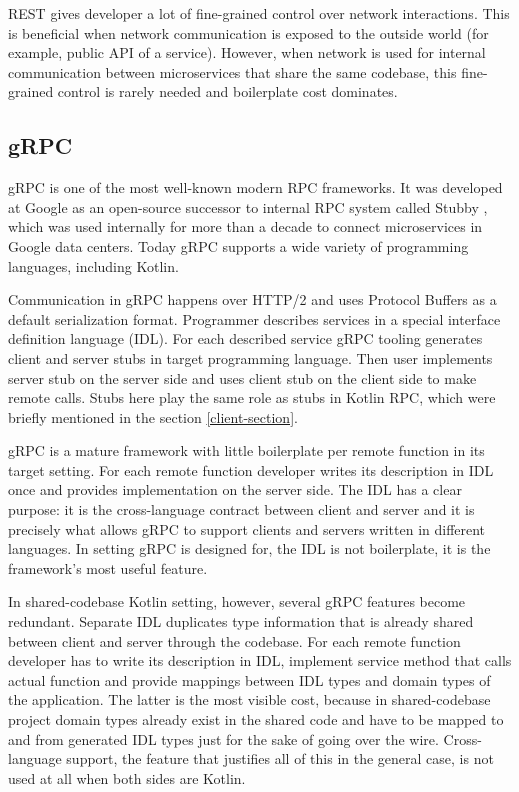 \documentclass[a4paper,11pt,oneside]{article}
\begin{document}
REST gives developer a lot of fine-grained control over network interactions. This is beneficial
when network communication is exposed to the outside world (for example, public API of a service).
However, when network is used for internal communication between microservices that share the
same codebase, this fine-grained control is rarely needed and boilerplate cost dominates.

\subsection{gRPC}

gRPC \cite{noauthor_grpc_nodate} is one of the most well-known modern RPC frameworks. It was
developed at Google as an open-source successor to internal RPC system called Stubby
\cite{ryan_grpc_2015}, which was used internally for more than a decade to connect microservices in
Google data centers. Today gRPC supports a wide variety of programming languages, including Kotlin.

Communication in gRPC happens over HTTP/2 and uses Protocol Buffers
\cite{noauthor_protocol_buffers_nodate} as a default serialization format. Programmer describes
services in a special interface definition language (IDL). For each described service gRPC tooling
generates client and server stubs in target programming language. Then user implements server stub
on the server side and uses client stub on the client side to make remote calls. Stubs here play
the same role as stubs in Kotlin RPC, which were briefly mentioned in the section
\ref{client-section}.

gRPC is a mature framework with little boilerplate per remote function in its target setting. For
each remote function developer writes its description in IDL once and provides implementation on
the server side. The IDL has a clear purpose: it is the cross-language contract between client and
server and it is precisely what allows gRPC to support clients and servers written in different
languages. In setting gRPC is designed for, the IDL is not boilerplate, it is the framework's most
useful feature.

In shared-codebase Kotlin setting, however, several gRPC features become redundant. Separate IDL
duplicates type information that is already shared between client and server through the codebase.
For each remote function developer has to write its description in IDL, implement service method
that calls actual function and provide mappings between IDL types and domain types of the
application. The latter is the most visible cost, because in shared-codebase project domain types
already exist in the shared code and have to be mapped to and from generated IDL types just for the
sake of going over the wire. Cross-language support, the feature that justifies all of this in the
general case, is not used at all when both sides are Kotlin.
\end{document}
